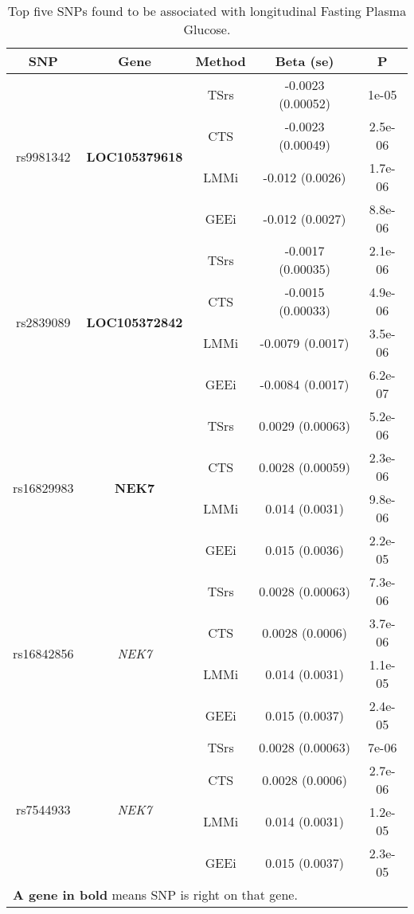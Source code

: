 \begin{table}[ht]
\centering
\caption{Top five SNPs found to be associated with longitudinal Fasting Plasma Glucose.} 
\label{tab:topslope}
{\small
\begin{tabular}{ccccc}
  \hline
SNP & Gene & Method & Beta (se) & P \\ 
  \hline
\hline
\multirow{4}{*}{rs9981342} & \multirow{4}{*}{\textbf{LOC105379618}} & TSrs & -0.0023 (0.00052) & 1e-05 \\ 
   &  & CTS & -0.0023 (0.00049) & 2.5e-06 \\ 
   &  & LMMi & -0.012 (0.0026) & 1.7e-06 \\ 
   &  & GEEi & -0.012 (0.0027) & 8.8e-06 \\ 
   \hline
\multirow{4}{*}{rs2839089} & \multirow{4}{*}{\textbf{LOC105372842}} & TSrs & -0.0017 (0.00035) & 2.1e-06 \\ 
   &  & CTS & -0.0015 (0.00033) & 4.9e-06 \\ 
   &  & LMMi & -0.0079 (0.0017) & 3.5e-06 \\ 
   &  & GEEi & -0.0084 (0.0017) & 6.2e-07 \\ 
   \hline
\multirow{4}{*}{rs16829983} & \multirow{4}{*}{\textbf{NEK7}} & TSrs & 0.0029 (0.00063) & 5.2e-06 \\ 
   &  & CTS & 0.0028 (0.00059) & 2.3e-06 \\ 
   &  & LMMi & 0.014 (0.0031) & 9.8e-06 \\ 
   &  & GEEi & 0.015 (0.0036) & 2.2e-05 \\ 
   \hline
\multirow{4}{*}{rs16842856} & \multirow{4}{*}{\textit{NEK7}} & TSrs & 0.0028 (0.00063) & 7.3e-06 \\ 
   &  & CTS & 0.0028 (0.0006) & 3.7e-06 \\ 
   &  & LMMi & 0.014 (0.0031) & 1.1e-05 \\ 
   &  & GEEi & 0.015 (0.0037) & 2.4e-05 \\ 
   \hline
\multirow{4}{*}{rs7544933} & \multirow{4}{*}{\textit{NEK7}} & TSrs & 0.0028 (0.00063) & 7e-06 \\ 
   &  & CTS & 0.0028 (0.0006) & 2.7e-06 \\ 
   &  & LMMi & 0.014 (0.0031) & 1.2e-05 \\ 
   &  & GEEi & 0.015 (0.0037) & 2.3e-05 \\ 
   \hline
\multicolumn{5}{l}{\footnotesize*\textbf{A gene in bold} means SNP is right on that gene.}
\end{tabular}
}
\end{table}
